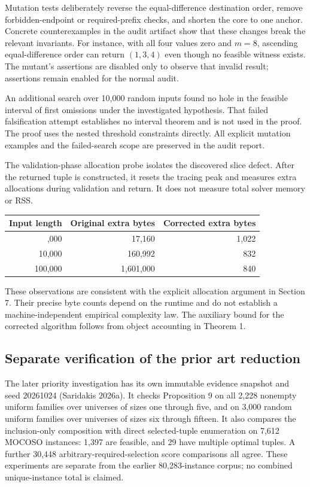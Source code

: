\documentclass[
  11pt,
  letterpaper,
]{article}
\begin{document}
Mutation tests deliberately reverse the equal-difference destination
order, remove forbidden-endpoint or required-prefix checks, and shorten
the core to one anchor. Concrete counterexamples in the audit artifact
show that these changes break the relevant invariants. For instance,
with all four values zero and \(m=8\), ascending equal-difference order
can return \((1,3,4)\) even though no feasible witness exists. The
mutant's assertions are disabled only to observe that invalid result;
assertions remain enabled for the normal audit.

An additional search over 10,000 random inputs found no hole in the
feasible interval of first omissions under the investigated hypothesis.
That failed falsification attempt establishes no interval theorem and is
not used in the proof. The proof uses the nested threshold constraints
directly. All explicit mutation examples and the failed-search scope are
preserved in the audit report.

The validation-phase allocation probe isolates the discovered slice
defect. After the returned tuple is constructed, it resets the tracing
peak and measures extra allocations during validation and return. It
does not measure total solver memory or RSS.

\begin{longtable}[]{@{}rrr@{}}
\toprule\noalign{}
Input length & Original extra bytes & Corrected extra bytes \\
\midrule\noalign{}
\endhead
\bottomrule\noalign{}
\endlastfoot
1,000 & 17,160 & 1,022 \\
10,000 & 160,992 & 832 \\
100,000 & 1,601,000 & 840 \\
\end{longtable}

These observations are consistent with the explicit allocation argument
in Section 7. Their precise byte counts depend on the runtime and do not
establish a machine-independent empirical complexity law. The auxiliary
bound for the corrected algorithm follows from object accounting in
Theorem 1.

\hypertarget{separate-verification-of-the-prior-art-reduction}{%
\subsection{Separate verification of the prior art
reduction}\label{separate-verification-of-the-prior-art-reduction}}

The later priority investigation has its own immutable evidence snapshot
and seed 20261024 (Saridakis 2026a). It checks Proposition 9 on all
2,228 nonempty uniform families over universes of sizes one through
five, and on 3,000 random uniform families over universes of sizes six
through fifteen. It also compares the inclusion-only composition with
direct selected-tuple enumeration on 7,612 MOCOSO instances: 1,397 are
feasible, and 29 have multiple optimal tuples. A further 30,448
arbitrary-required-selection score comparisons all agree. These
experiments are separate from the earlier 80,283-instance corpus; no
combined unique-instance total is claimed.
\end{document}
